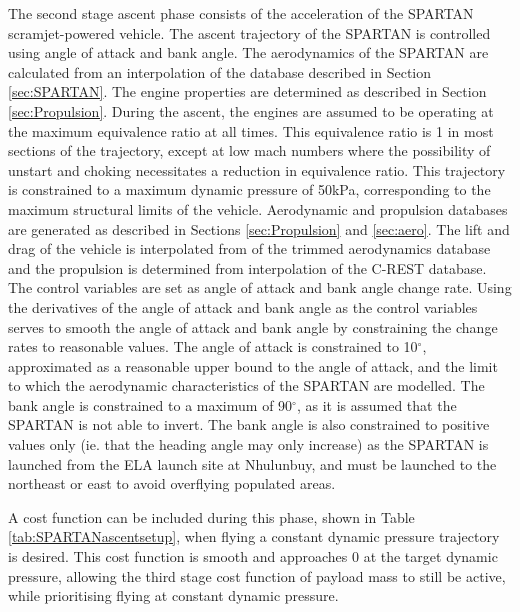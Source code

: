The second stage ascent phase consists of the acceleration of the SPARTAN scramjet-powered vehicle. 
The ascent trajectory of the SPARTAN is controlled using angle of attack and bank angle. The aerodynamics of the SPARTAN are calculated from an interpolation of the database described in Section \ref{sec:SPARTAN}. The engine properties are determined as described in Section \ref{sec:Propulsion}.
During the ascent, the engines are assumed to be operating at the maximum equivalence ratio at all times. This equivalence ratio is 1 in most sections of the trajectory, except at low mach numbers where the possibility of unstart and choking necessitates a reduction in equivalence ratio. This trajectory is constrained to a maximum dynamic pressure of 50kPa, corresponding to the maximum structural limits of the vehicle. Aerodynamic and propulsion databases are generated as described in Sections \ref{sec:Propulsion} and \ref{sec:aero}. The lift and drag of the vehicle is interpolated from of the trimmed aerodynamics database and the propulsion is determined from interpolation of the C-REST database. 
The control variables are set as angle of attack and bank angle change rate. Using the derivatives of the angle of attack and bank angle as the control variables serves to smooth the angle of attack and bank angle by constraining the change rates to reasonable values. The angle of attack is constrained to 10$^\circ$, approximated as a reasonable upper bound to the angle of attack, and the limit to which the aerodynamic characteristics of the SPARTAN are modelled. The bank angle is constrained to a maximum of 90$^\circ$, as it is assumed that the SPARTAN is not able to invert. The bank angle is also constrained to positive values only (ie. that the heading angle may only increase) as the SPARTAN is launched from the ELA launch site at Nhulunbuy, and must be launched to the northeast or east to avoid overflying populated areas. 

A cost function can be included during this phase, shown in Table \ref{tab:SPARTANascentsetup}, when flying a constant dynamic pressure trajectory is desired. This cost function is smooth and approaches 0 at the target dynamic pressure, allowing the third stage cost function of payload mass to still be active, while prioritising flying at constant dynamic pressure. 


